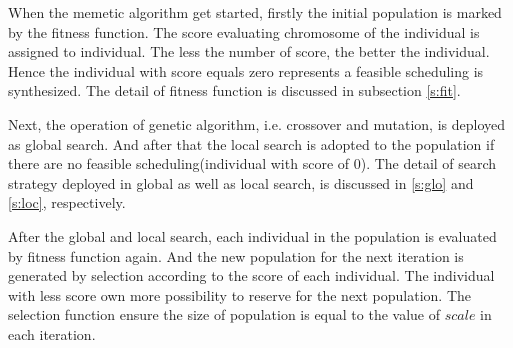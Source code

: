 \documentclass[journal]{IEEEtran}
\newcommand{\calS}{\mathcal{S}}
\theoremstyle{remark}
\begin{document}
When the memetic algorithm get started, firstly the initial population is marked by the fitness function.
The score evaluating chromosome of the individual is assigned to individual.
The less the number of score, the better the individual.
Hence the individual with score equals zero represents a feasible scheduling is synthesized.
The detail of fitness function is discussed in subsection \ref{s:fit}.

Next, the operation of genetic algorithm,
 i.e. crossover and mutation,
  is deployed as global search.
And after that the local search is adopted to the population if there are no feasible scheduling(individual with score of 0).
The detail of search strategy deployed in global as well as local search, is discussed in \ref{s:glo} and \ref{s:loc}, respectively.

After the global and local search,
 each individual in the population is evaluated by fitness function again.
And the new population for the next iteration is generated by selection according to the score of each individual.
The individual with less score own more possibility to reserve for the next population.
The selection function ensure the size of population is equal to the value of $scale$ in each iteration.

\end{document}

